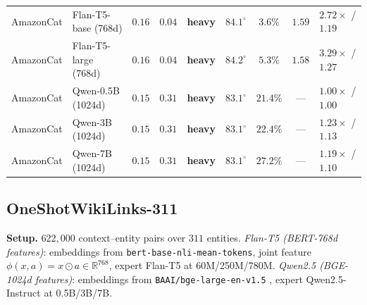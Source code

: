 \documentclass{article}
\theoremstyle{definition}
\theoremstyle{remark}
\theoremstyle{remark}
\begin{document}
\begin{table}[h]
\begin{tabular}{@{}llccccccl@{}}
AmazonCat & Flan-T5-base (768d)  & $\mathbf{0.16}$ & $\mathbf{0.04}$ & \textbf{heavy} & $\mathbf{84.1^\circ}$ & $3.6\%$ & $1.59$ & $2.72\times$ / $1.19$ \\
AmazonCat & Flan-T5-large (768d) & $\mathbf{0.16}$ & $\mathbf{0.04}$ & \textbf{heavy} & $\mathbf{84.2^\circ}$ & $5.3\%$ & $1.58$ & $\mathbf{3.29\times}$ / $\mathbf{1.27}$ \\
AmazonCat & Qwen-0.5B (1024d) & $\mathbf{0.15}$ & $0.31$ & \textbf{heavy} & $\mathbf{83.1^\circ}$ & $21.4\%$ & --- & $1.00\times$ / $1.00$ \\
AmazonCat & Qwen-3B (1024d)   & $\mathbf{0.15}$ & $0.31$ & \textbf{heavy} & $\mathbf{83.1^\circ}$ & $22.4\%$ & --- & $\mathbf{1.23\times}$ / $\mathbf{1.13}$ \\
AmazonCat & Qwen-7B (1024d)   & $\mathbf{0.15}$ & $0.31$ & \textbf{heavy} & $\mathbf{83.1^\circ}$ & $27.2\%$ & --- & $1.19\times$ / $1.10$ \\
\bottomrule
\end{tabular}
\end{table}

\subsection{OneShotWikiLinks-311}
\label{sec:wiki}

\textbf{Setup.} $622{,}000$ context--entity pairs over $311$ entities.
\emph{Flan-T5 (BERT-768d features)}: embeddings from
\texttt{bert-base-nli-mean-tokens}, joint feature $\phi(x,a)=x\odot a\in\mathbb R^{768}$,
expert Flan-T5 \cite{chung2024scaling} at 60M/250M/780M.
\emph{Qwen2.5 (BGE-1024d features)}: embeddings from
\texttt{BAAI/bge-large-en-v1.5} \cite{xiao2024c}, expert Qwen2.5-Instruct
\cite{hui2024qwen2} at 0.5B/3B/7B.
\end{document}
